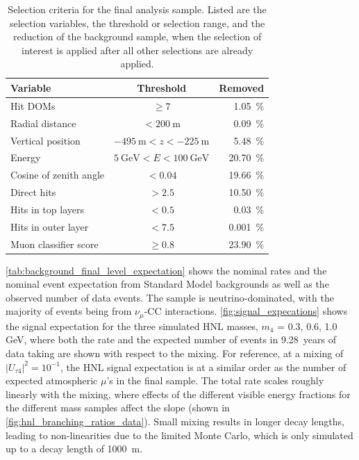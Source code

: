\documentclass[
    aps,
    prd,
    reprint,
    amsmath,
    amssymb,
    nofootinbib,
    linenumbers,
    superscriptaddress,
    floatfix
]{revtex4-2}
\newcommand{\gev}{\giga\electronvolt}
\def\nomathut4{|U_{\tau4}|^2}
\begin{document}
\begin{table}[h]
    \footnotesize
        \begin{tabular}{ lcr }
        \hline\hline    
        \textbf{Variable} & \textbf{Threshold} & \textbf{Removed} \\
        \hline\hline    
        Hit DOMs & $\geq 7$ & \SI{1.05}{\percent} \\
        Radial distance & $< \SI{200}{\meter}$ & \SI{0.09}{\percent} \\
        Vertical position & $\SI{-495}{\meter} < z < \SI{-225}{\meter}$ & \SI{5.48}{\percent} \\
        Energy & $\SI{5}{\gev} < E < \SI{100}{\gev}$ & \SI{20.70}{\percent} \\    
        Cosine of zenith angle & $< 0.04$ & \SI{19.66}{\percent} \\
        Direct hits & $> 2.5$ & \SI{10.50}{\percent} \\
        Hits in top layers & $< 0.5$ & \SI{0.03}{\percent} \\
        Hits in outer layer & $< 7.5$ & \SI{0.001}{\percent} \\
        Muon classifier score & $\geq 0.8$ & \SI{23.90}{\percent} \\
        \hline
        \end{tabular}
    \internallinenumbers
    \caption{Selection criteria for the final analysis sample. Listed are the selection variables, the threshold or selection range, and the reduction of the background sample, when the selection of interest is applied after all other selections are already applied.}
    \label{tab:analysis_cuts}
\end{table}

\cref{tab:background_final_level_expectation} shows the nominal rates and the nominal event expectation from Standard Model backgrounds as well as the observed number of data events. The sample is neutrino-dominated, with the majority of events being from $\nu_\mu$-CC interactions. \cref{fig:signal_expecations} shows the signal expectation for the three simulated HNL masses, $m_4$ = {0.3, 0.6, 1.0}\,GeV, where both the rate and the expected number of events in \SI{9.28}{years} of data taking are shown with respect to the mixing. For reference, at a mixing of $\nomathut4=10^{-1}$, the HNL signal expectation is at a similar order as the number of expected atmospheric $\mu$'s in the final sample. The total rate scales roughly linearly with the mixing, where effects of the different visible energy fractions for the different mass samples affect the slope (shown in \cref{fig:hnl_branching_ratios_data}). Small mixing results in longer decay lengths, leading to non-linearities due to the limited Monte Carlo, which is only simulated up to a decay length of \SI{1000}{\meter}.
\end{document}
